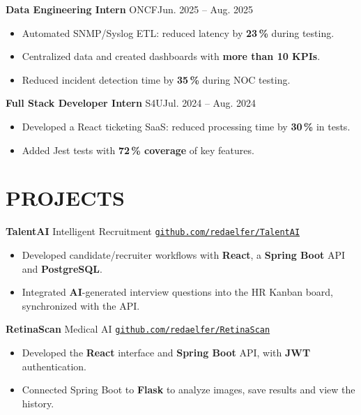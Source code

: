 \documentclass[11pt,a4paper]{article}
\newcommand{\entry}[2]{\noindent #1\hfill #2\par}
\newcommand{\jobgap}{\vspace{5pt}}
\begin{document}
\jobgap
\entry{\textbf{Data Engineering Intern} \textbar{} ONCF}{Jun. 2025 -- Aug. 2025}
\begin{itemize}
  \item Automated SNMP/Syslog ETL: reduced latency by \textbf{23\,\%} during testing.
  \item Centralized data and created dashboards with \textbf{more than 10 KPIs}.
  \item Reduced incident detection time by \textbf{35\,\%} during NOC testing.
\end{itemize}

\jobgap
\entry{\textbf{Full Stack Developer Intern} \textbar{} S4U}{Jul. 2024 -- Aug. 2024}
\begin{itemize}
  \item Developed a React ticketing SaaS: reduced processing time by \textbf{30\,\%} in tests.
  \item Added Jest tests with \textbf{72\,\% coverage} of key features.
\end{itemize}

\section*{PROJECTS}

\textbf{TalentAI} \textbar{} Intelligent Recruitment \textbar{} \href{https://github.com/redaelfer/TalentAI}{\nolinkurl{github.com/redaelfer/TalentAI}}\par
\begin{itemize}
  \item Developed candidate/recruiter workflows with \textbf{React}, a \textbf{Spring Boot} API and \textbf{PostgreSQL}.
  \item Integrated \textbf{AI}-generated interview questions into the HR Kanban board, synchronized with the API.
\end{itemize}

\jobgap
\textbf{RetinaScan} \textbar{} Medical AI \textbar{} \href{https://github.com/redaelfer/RetinaScan}{\nolinkurl{github.com/redaelfer/RetinaScan}}\par
\begin{itemize}
  \item Developed the \textbf{React} interface and \textbf{Spring Boot} API, with \textbf{JWT} authentication.
  \item Connected Spring Boot to \textbf{Flask} to analyze images, save results and view the history.
\end{itemize}
\end{document}
